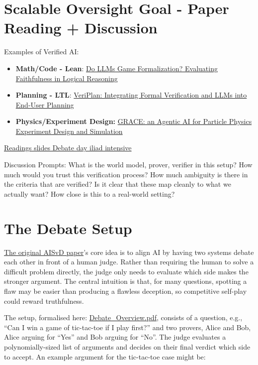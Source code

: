 \documentclass[11pt]{article}
\begin{document}
\section{Scalable Oversight Goal - Paper Reading + Discussion}
\label{sec:verifiedai}

Examples of Verified AI:

\begin{itemize}
  \item \textbf{Math/Code - Lean}: \href{https://arxiv.org/pdf/2604.19459}{Do LLMs Game Formalization? Evaluating Faithfulness in Logical Reasoning}
  \item \textbf{Planning - LTL}: \href{https://arxiv.org/pdf/2502.17898v1}{VeriPlan: Integrating Formal Verification and LLMs into End-User Planning}
  \item \textbf{Physics/Experiment Design:} \href{https://arxiv.org/pdf/2602.15039}{GRACE: an Agentic AI for Particle Physics Experiment Design and Simulation}
\end{itemize}

\href{https://docs.google.com/presentation/d/1JMkgZZyPUG5zcpNEXGfc84xq0urL62r4O6-lnFvQGiw/edit?usp=sharing}{Readings slides Debate day iliad intensive}

Discussion Prompts: What is the world model, prover, verifier in this setup? How
much would you trust this verification process? How much ambiguity is there in
the criteria that are verified? Is it clear that these map cleanly to what we
actually want? How close is this to a real-world setting?

\section{The Debate Setup}
\label{sec:setup}

\href{https://arxiv.org/pdf/1805.00899}{The original AISvD paper}'s core idea is
to align AI by having two systems debate each other in front of a human judge.
Rather than requiring the human to solve a difficult problem directly, the judge
only needs to evaluate which side makes the stronger argument. The central
intuition is that, for many questions, spotting a flaw may be easier than
producing a flawless deception, so competitive self-play could reward
truthfulness.

The setup, formalised here: \href{https://drive.google.com/file/d/1KMqJDdFITy3YRz02oIfa4RctxP-h-ERF/view?usp=drive_link}{Debate\_Overview.pdf}, consists of a question, e.g., ``Can I win a game of
tic-tac-toe if I play first?'' and two provers, Alice and Bob, Alice arguing for
``Yes'' and Bob arguing for ``No''. The judge evaluates a polynomially-sized list
of arguments and decides on their final verdict which side to accept. An example
argument for the tic-tac-toe case might be:
\end{document}

